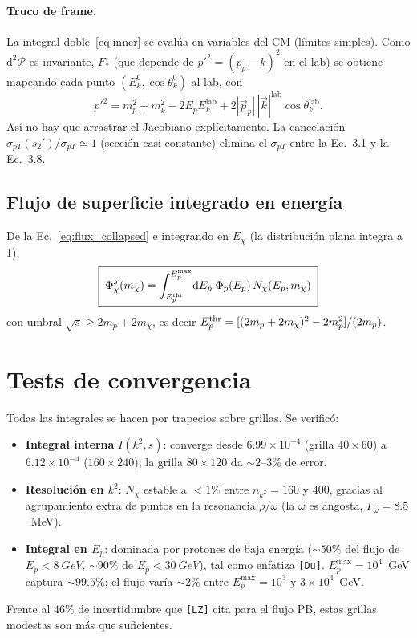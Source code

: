 \documentclass[11pt,a4paper]{article}
\newcommand{\mchi}{m_\chi}
\newcommand{\Ek}{E_k}
\newcommand{\Ekz}{E_k^0}
\newcommand{\cosz}{\cos\theta_k^0}
\newcommand{\Phip}{\Phi_p}
\newcommand{\dd}{\mathrm{d}}
\newcommand{\Du}{\texttt{[Du]}}
\newcommand{\LZ}{\texttt{[LZ]}}
\begin{document}
\paragraph{Truco de frame.} La integral doble~\eqref{eq:inner} se eval\'ua en
variables del CM (l\'imites simples). Como $\dd^2\mathcal{P}$ es invariante,
$F_\ast$ (que depende de $p'^2=(p_p-k)^2$ en el lab) se obtiene mapeando cada
punto $(\Ekz,\cosz)$ al lab, con
\begin{equation}
p'^2=m_p^2+m_k^2-2E_p\Ek^{\mathrm{lab}}+2|\vec p_p|\,|\vec k|^{\mathrm{lab}}\cos\theta_k^{\mathrm{lab}} .
\end{equation}
As\'i no hay que arrastrar el Jacobiano expl\'icitamente. La cancelaci\'on
$\sigma_{pT}(s_2')/\sigma_{pT}\simeq1$ (secci\'on casi constante) elimina el
$\sigma_{pT}$ entre la Ec.~3.1 y la Ec.~3.8.

\subsection{Flujo de superficie integrado en energ\'ia}

De la Ec.~\eqref{eq:flux_collapsed} e integrando en $E_\chi$ (la distribuci\'on
plana integra a 1),
\begin{equation}
\boxed{\;
\Phi_\chi^s(\mchi)=\int_{E_p^{\rm thr}}^{E_p^{\max}}\!\dd E_p\;
\Phip(E_p)\,N_\chi(E_p,\mchi)
\;}
\end{equation}
con umbral $\sqrt{s}\ge2m_p+2\mchi$, es decir
$E_p^{\rm thr}=[(2m_p+2\mchi)^2-2m_p^2]/(2m_p)$.

\section{Tests de convergencia}

Todas las integrales se hacen por trapecios sobre grillas. Se verific\'o:
\begin{itemize}
\item \textbf{Integral interna} $I(k^2,s)$: converge desde
$6.99\times10^{-4}$ (grilla $40\times60$) a $6.12\times10^{-4}$
($160\times240$); la grilla $80\times120$ da $\sim\!2$--$3\%$ de error.
\item \textbf{Resoluci\'on en $k^2$}: $N_\chi$ estable a $<1\%$ entre
$n_{k^2}=160$ y $400$, gracias al agrupamiento extra de puntos en la
resonancia $\rho/\omega$ (la $\omega$ es angosta, $\Gamma_\omega=8.5$~MeV).
\item \textbf{Integral en $E_p$}: dominada por protones de baja energ\'ia
($\sim\!50\%$ del flujo de $E_p<\SI{8}{GeV}$, $\sim\!90\%$ de
$E_p<\SI{30}{GeV}$), tal como enfatiza \Du. $E_p^{\max}=10^4$~GeV captura
$\sim\!99.5\%$; el flujo var\'ia $\sim\!2\%$ entre $E_p^{\max}=10^3$ y
$3\times10^4$~GeV.
\end{itemize}
Frente al $46\%$ de incertidumbre que \LZ{} cita para el flujo PB, estas
grillas modestas son m\'as que suficientes.
\end{document}
